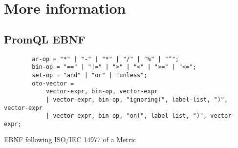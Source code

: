 \chapter{More information}
\section{PromQL EBNF}

\begin{listing}[H]
	\begin{samepage}
		\begin{verbatim}
		ar-op = "*" | "-" | "*" | "/" | "%" | "^";
		bin-op = "==" | "!=" | ">" | "<" | ">=" | "<=";
		set-op = "and" | "or" | "unless";
		oto-vector = 
			vector-expr, bin-op, vector-expr
			| vector-expr, bin-op, "ignoring(", label-list, ")", vector-expr
			| vector-expr, bin-op, "on(", label-list, ")", vector-expr;
		\end{verbatim}
		\caption{EBNF following ISO/IEC 14977 of a Metric}
	\end{samepage}
\end{listing}
